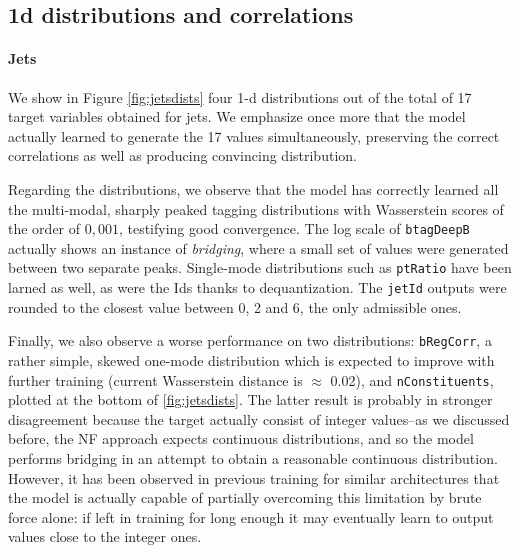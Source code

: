 \subsection{1d distributions and correlations}


\paragraph{Jets}

We show in Figure \ref{fig:jetsdists} four 1-d distributions out of the total of 17 target variables obtained for jets. We emphasize once more that the model actually learned to generate the 17 values simultaneously, preserving the correct correlations as well as producing convincing distribution.

Regarding the distributions, we observe that the model has correctly learned all the multi-modal, sharply peaked tagging distributions with Wasserstein scores of the order of $0,001$, testifying good convergence. The log scale of \texttt{btagDeepB} actually shows an instance of \emph{bridging}, where a small set of values were generated between two separate peaks. Single-mode distributions such as \texttt{ptRatio} have been larned as well, as were the Ids thanks to dequantization. The \texttt{jetId} outputs were rounded to the closest value between 0, 2 and 6, the only admissible ones.

Finally, we also observe a worse performance on two distributions: \texttt{bRegCorr}, a rather simple, skewed one-mode distribution which is expected to improve with further training (current Wasserstein distance is $\approx$ 0.02), and \texttt{nConstituents}, plotted at the bottom of \ref{fig:jetsdists}. The latter result is probably in stronger disagreement because the target actually consist of integer values--as we discussed before, the NF approach expects continuous distributions, and so the model performs bridging in an attempt to obtain a reasonable continuous distribution. However, it has been observed in previous training for similar architectures that the model is actually capable of partially overcoming this limitation by brute force alone: if left in training for long enough it may eventually learn to output values close to the integer ones.


